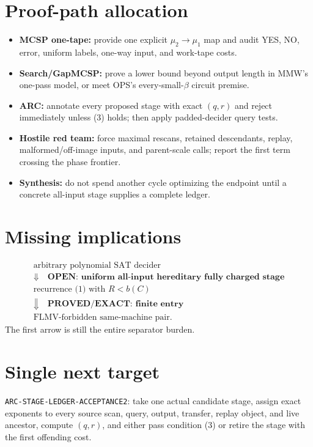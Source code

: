 \documentclass[11pt]{article}
\begin{document}
\section*{Proof-path allocation}
\begin{itemize}[leftmargin=*]
  \item \textbf{MCSP one-tape:} provide one explicit $\mu_2\to\mu_1$ map and
  audit YES, NO, error, uniform labels, one-way input, and work-tape costs.
  \item \textbf{Search/GapMCSP:} prove a lower bound beyond output length in
  MMW's one-pass model, or meet OPS's every-small-$\beta$ circuit premise.
  \item \textbf{ARC:} annotate every proposed stage with exact $(q,r)$ and
  reject immediately unless (3) holds; then apply padded-decider query tests.
  \item \textbf{Hostile red team:} force maximal rescans, retained descendants,
  replay, malformed/off-image inputs, and parent-scale calls; report the first
  term crossing the phase frontier.
  \item \textbf{Synthesis:} do not spend another cycle optimizing the endpoint
  until a concrete all-input stage supplies a complete ledger.
\end{itemize}

\section*{Missing implications}
\[
\begin{array}{c}
\text{arbitrary polynomial SAT decider}\quad\\
\Downarrow\quad\textbf{OPEN: uniform all-input hereditary fully charged stage}\\
\text{recurrence (1) with }R<b(C)\\
\Downarrow\quad\textbf{PROVED/EXACT: finite entry}\\
\text{FLMV-forbidden same-machine pair}.
\end{array}
\]
The first arrow is still the entire separator burden.

\section*{Single next target}
\texttt{ARC-STAGE-LEDGER-ACCEPTANCE2}: take one actual candidate stage, assign
exact exponents to every source scan, query, output, transfer, replay object,
and live ancestor, compute $(q,r)$, and either pass condition (3) or retire the
stage with the first offending cost.
\end{document}
